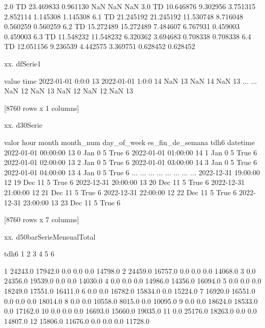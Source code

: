 \documentclass[a4paper,10pt,twocolumn]{article}
\begin{document}
\begin{Form}
2.0 TD  23.469833   0.961130        NaN        NaN        NaN          
3.0 TD  10.646876   9.302956   3.751315   2.852114   1.145308  1.145308
6.1 TD  21.245192  21.245192  11.530748   8.716048   0.560259  0.560259
6.2 TD  15.272489  15.272489   7.484607   6.767931   0.459003  0.459003
6.3 TD  11.548232  11.548232   6.320362   3.694683   0.708338  0.708338
6.4 TD  12.051156   9.236539   4.442575   3.369751   0.628452  0.628452

xx. dfSerie1

                  value
time                   
2022-01-01 0:0:0     13
2022-01-01 1:0:0     14
NaN                  13
NaN                  14
NaN                  13
...                 ...
NaN                  12
NaN                  13
NaN                  12
NaN                  12
NaN                  13

[8760 rows x 1 columns]

xx. d30Serie

                     valor  hour month  month_num  day_of_week  es_fin_de_semana  tdh6
datetime                                                                              
2022-01-01 00:00:00     13     0   Jan          0            5              True     6
2022-01-01 01:00:00     14     1   Jan          0            5              True     6
2022-01-01 02:00:00     13     2   Jan          0            5              True     6
2022-01-01 03:00:00     14     3   Jan          0            5              True     6
2022-01-01 04:00:00     13     4   Jan          0            5              True     6
...                    ...   ...   ...        ...          ...               ...   ...
2022-12-31 19:00:00     12    19   Dec         11            5              True     6
2022-12-31 20:00:00     13    20   Dec         11            5              True     6
2022-12-31 21:00:00     12    21   Dec         11            5              True     6
2022-12-31 22:00:00     12    22   Dec         11            5              True     6
2022-12-31 23:00:00     13    23   Dec         11            5              True     6

[8760 rows x 7 columns]

xx. d50barSerieMensualTotal

tdh6        1        2        3        4        5        6
                                                          
1     24243.0  17942.0      0.0      0.0      0.0  14798.0
2     24459.0  16757.0      0.0      0.0      0.0  14068.0
3         0.0  24356.0  19539.0      0.0      0.0  14030.0
4         0.0      0.0      0.0  14986.0  14356.0  16094.0
5         0.0      0.0      0.0  18249.0  17551.0  16411.0
6         0.0      0.0  16782.0  15834.0      0.0  15224.0
7     16920.0  16551.0      0.0      0.0      0.0  18014.0
8         0.0      0.0  10558.0   8015.0      0.0  10095.0
9         0.0      0.0  18624.0  18533.0      0.0  17162.0
10        0.0      0.0      0.0  16693.0  15660.0  19035.0
11        0.0  25176.0  18263.0      0.0      0.0  14807.0
12    15806.0  11676.0      0.0      0.0      0.0  11728.0
\fi
\end{Form}
\end{document}
